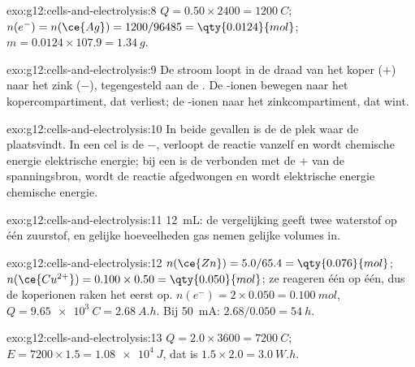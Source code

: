 \begin{solution}{exo:g12:cells-and-electrolysis:8}
$Q = 0.50 \times 2400 = \qty{1200}{C}$; $n(e^-) = n(\ce{Ag}) =
1200/96485 = \qty{0.0124}{mol}$; $m = 0.0124 \times 107.9 =
\qty{1.34}{g}$.
\end{solution}

\begin{solution}{exo:g12:cells-and-electrolysis:9}
De stroom loopt in de draad van het koper ($+$) naar het zink ($-$),
tegengesteld aan de . De -ionen bewegen naar het
kopercompartiment, dat  verliest; de -ionen naar het
zinkcompartiment, dat  wint.
\end{solution}

\begin{solution}{exo:g12:cells-and-electrolysis:10}
In beide gevallen is de  de plek waar de  plaatsvindt. In
een cel is de  $-$, verloopt de reactie vanzelf en wordt chemische
energie elektrische energie; bij een  is de  verbonden
met de $+$ van de spanningsbron, wordt de reactie afgedwongen en wordt
elektrische energie chemische energie.
\end{solution}

\begin{solution}{exo:g12:cells-and-electrolysis:11}
\qty{12}{mL}: de vergelijking  geeft twee 
waterstof op één  zuurstof, en gelijke hoeveelheden gas nemen
gelijke volumes in.
\end{solution}

\begin{solution}{exo:g12:cells-and-electrolysis:12}
$n(\ce{Zn}) = 5.0/65.4 = \qty{0.076}{mol}$;
$n(\ce{Cu^{2+}}) = 0.100 \times 0.50 = \qty{0.050}{mol}$; ze reageren één
op één, dus de koperionen raken het eerst op. $n(e^-) = 2 \times 0.050
= \qty{0.100}{mol}$, $Q = \qty{9.65e3}{C} = \qty{2.68}{A.h}$. Bij
\qty{50}{mA}: $2.68/0.050 = \qty{54}{h}$.
\end{solution}

\begin{solution}{exo:g12:cells-and-electrolysis:13}
$Q = 2.0 \times 3600 = \qty{7200}{C}$; $E = 7200 \times 1.5 =
\qty{1.08e4}{J}$, dat is $1.5 \times 2.0 = \qty{3.0}{W.h}$.
\end{solution}

